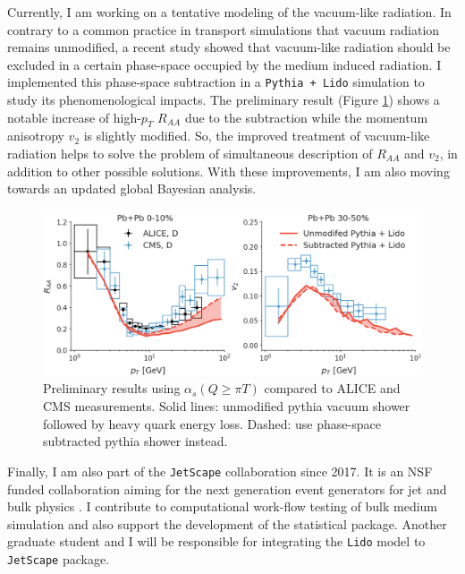 \documentclass[12pt,a4paper]{revtex4-1}
\begin{document}
Currently, I am working on a tentative modeling of the vacuum-like radiation. 
In contrary to a common practice in transport simulations that vacuum radiation remains unmodified, a recent study \cite{Caucal:2018dla} showed that vacuum-like radiation should be excluded in a certain phase-space occupied by the medium induced radiation.
I implemented this phase-space subtraction in a {\tt Pythia + Lido} simulation to study its phenomenological impacts.
The preliminary result (Figure \ref{fig:prelim}) shows a notable increase of high-$p_T$ $R_{AA}$ due to the subtraction while the momentum anisotropy $v_2$ is slightly modified.
So, the improved treatment of vacuum-like radiation helps to solve the problem of simultaneous description of $R_{AA}$ and $v_2$, in addition to other possible solutions.
With these improvements, I am also moving towards an updated global Bayesian analysis.

\begin{figure}[ht]
\includegraphics[width=.85\textwidth]{Lido_obs.png}
\caption{Preliminary results using $\alpha_s(Q\geq\pi T)$ compared to ALICE \cite{Acharya:2018hre} and CMS \cite{Sirunyan:2017plt} measurements. Solid lines: unmodified pythia vacuum shower followed by heavy quark energy loss. Dashed: use phase-space subtracted pythia shower instead.}\label{fig:prelim}
\end{figure}

Finally, I am also part of the {\tt JetScape} collaboration since 2017. 
It is an NSF funded collaboration aiming for the next generation event generators for jet and bulk physics \cite{JetScape}. 
I contribute to computational work-flow testing of bulk medium simulation and also support the development of the statistical package.
Another graduate student and I will be responsible for integrating the {\tt Lido} model to {\tt JetScape} package.
\end{document}
